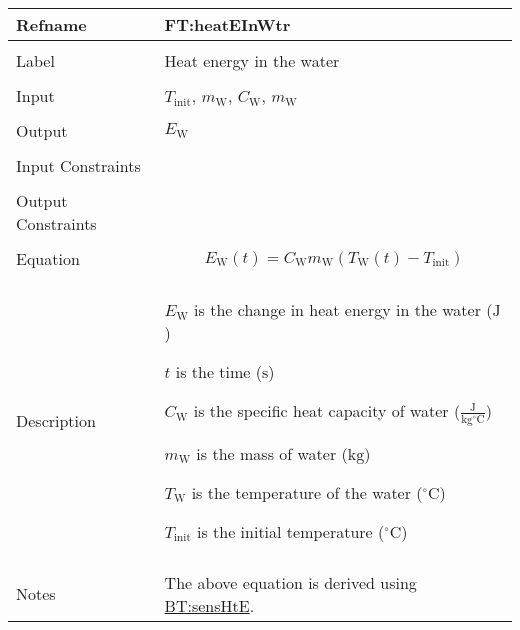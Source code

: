 \documentclass[12pt]{article}
\begin{document}
\vspace{\baselineskip}
\noindent
\begin{minipage}{\textwidth}
\begin{tabular}{>{\raggedright}p{}>{\raggedright\arraybackslash}p{}}
\toprule \textbf{Refname} & \textbf{FT:heatEInWtr}
\label{FT:heatEInWtr}
\\ \midrule \\
Label & Heat energy in the water
        
\\ \midrule \\
Input & ${T_{\text{init}}}$, ${m_{\text{W}}}$, ${C_{\text{W}}}$, ${m_{\text{W}}}$
        
\\ \midrule \\
Output & ${E_{\text{W}}}$
         
\\ \midrule \\
Input Constraints & 
\\ \midrule \\
Output Constraints & 
\\ \midrule \\
Equation & \begin{displaymath}
           {E_{\text{W}}}\left(t\right)={C_{\text{W}}} {m_{\text{W}}} \left({T_{\text{W}}}\left(t\right)-{T_{\text{init}}}\right)
           \end{displaymath}
\\ \midrule \\
Description & \begin{symbDescription}
              \item{${E_{\text{W}}}$ is the change in heat energy in the water (${\text{J}}$)}
              \item{$t$ is the time (${\text{s}}$)}
              \item{${C_{\text{W}}}$ is the specific heat capacity of water ($\frac{\text{J}}{\text{kg}{}^{\circ}\text{C}}$)}
              \item{${m_{\text{W}}}$ is the mass of water (${\text{kg}}$)}
              \item{${T_{\text{W}}}$ is the temperature of the water (${{}^{\circ}\text{C}}$)}
              \item{${T_{\text{init}}}$ is the initial temperature (${{}^{\circ}\text{C}}$)}
              \end{symbDescription}
\\ \midrule \\
Notes & The above equation is derived using \hyperref[BT:sensHtE]{BT:sensHtE}.
        

\end{tabular}
\end{minipage}
\end{document}
